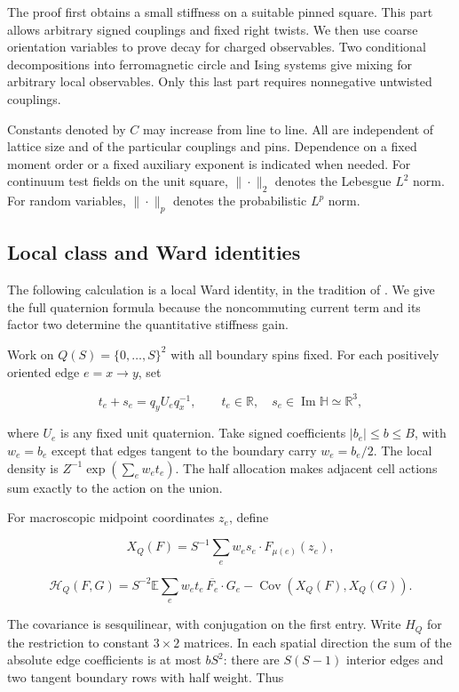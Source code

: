 The proof first obtains a small stiffness on a suitable pinned square. This
part allows arbitrary signed couplings and fixed right twists. We then use
coarse orientation variables to prove decay for charged observables. Two
conditional decompositions into ferromagnetic circle and Ising systems give
mixing for arbitrary local observables. Only this last part requires
nonnegative untwisted couplings.

Constants denoted by \(C\) may increase from line to line. All are independent
of lattice size and of the particular couplings and pins. Dependence on a
fixed moment order or a fixed auxiliary exponent is indicated when needed.
For continuum test fields on the unit square, \(\|\cdot\|_2\) denotes the
Lebesgue \(L^2\) norm. For random variables, \(\|\cdot\|_p\) denotes the
probabilistic \(L^p\) norm.

\subsection{Local class and Ward identities}\label{pre:local}

The following calculation is a local Ward identity, in the tradition of
\cite{Mermin1967,DriesslerLandauPerez,AizenmanSimonWard}. We give the full
quaternion formula because the noncommuting current term and its factor
two determine the quantitative stiffness gain.

Work on \(Q(S)=\{0,\ldots,S\}^2\) with all boundary spins fixed. For each positively oriented edge \(e=x\to y\), set

\[
 t_e+s_e=q_yU_eq_x^{-1},\qquad t_e\in\mathbb R,\quad s_e\in\operatorname{Im}\mathbb H\simeq\mathbb R^3,
\]

where \(U_e\) is any fixed unit quaternion. Take signed coefficients \(|b_e|\leq b\leq B\), with \(w_e=b_e\) except that edges tangent to the boundary carry \(w_e=b_e/2\). The local density is \(Z^{-1}\exp(\sum_e w_et_e)\). The half allocation makes adjacent cell actions sum exactly to the action on the union.

For macroscopic midpoint coordinates \(z_e\), define

\[
 X_Q(F)=S^{-1}\sum_e w_es_e\cdot F_{\mu(e)}(z_e),
\]

\begin{equation}
 \mathcal H_Q(F,G)=S^{-2}\mathbb E\sum_e w_et_e\,\overline{F_e}\cdot G_e
 -\operatorname{Cov}(X_Q(F),X_Q(G)).
\label{eq:pre:1-1}
\end{equation}

The covariance is sesquilinear, with conjugation on the first entry. Write \(H_Q\) for the restriction to constant \(3\times2\) matrices. In each spatial direction the sum of the absolute edge coefficients is at most \(bS^2\): there are \(S(S-1)\) interior edges and two tangent boundary rows with half weight. Thus

